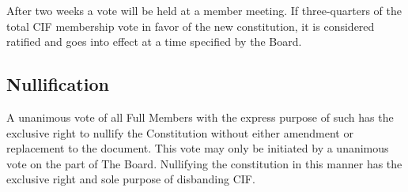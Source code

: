 After two weeks a vote will be held at a member meeting. If three-quarters of the total CIF membership vote in favor of the new constitution, it is considered ratified and goes into effect at a time specified by the Board.



	\subsection{Nullification}

		A unanimous vote of all Full Members with the express purpose of such has the exclusive right to nullify the Constitution without either amendment or replacement to the document. This vote may only be initiated by a unanimous vote on the part of The Board. Nullifying the constitution in this manner has the exclusive right and sole purpose of disbanding CIF\@.
